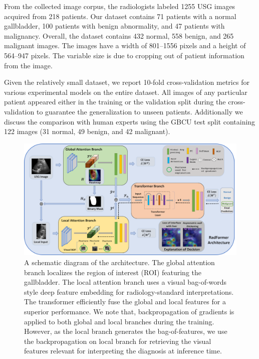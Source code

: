 %
From the collected image corpus, the radiologists labeled 1255 USG images acquired from 218 patients. Our dataset contains 71 patients with a normal gallbladder, 100 patients with benign abnormality, and 47 patients with malignancy. Overall, the dataset contains 432 normal, 558 benign, and 265 malignant images. The images have a width of 801--1556 pixels and a height of 564--947 pixels. The variable size is due to cropping out of patient information from the image.

%
Given the relatively small dataset, we report 10-fold cross-validation metrics for various experimental models on the entire dataset. All images of any particular patient appeared either in the training or the validation split during the cross-validation to guarantee the generalization to unseen patients. Additionally we discuss the comparison with human experts using the GBCU test split containing 122 images (31 normal, 49 benign, and 42 malignant).

\begin{figure}[t]
    \centering
    \includegraphics[width=\textwidth]{figs/radformer/arch-radformer.png}
    \caption[Schematic diagram of the \radformer architecture]{A schematic diagram of the \radformer architecture. The global attention branch localizes the region of interest (ROI) featuring the gallbladder. The local attention branch uses a visual bag-of-words style deep feature embedding for radiology-standard interpretations. The transformer efficiently fuse the global and local features for a superior performance. We note that, backpropagation of gradients is applied to both global and local branches during the training. However, as the local branch generates the bag-of-features, we use the backpropagation on local branch for retrieving the visual features relevant for interpreting the diagnosis at inference time. }
    \label{fig:arch}
\end{figure}
%


